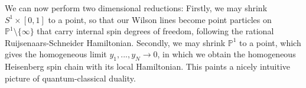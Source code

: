 \documentclass[11pt]{report}
\theoremstyle{definition}
\theoremstyle{remark}
\theoremstyle{remark}
\renewcommand{\P}{\mathbb{P}}
\begin{document}
We can now perform two dimensional reductions: Firstly, we may shrink $S^1 \times [0,1]$ to a point, so that our Wilson lines become point particles on $\P^1 \setminus \{ \infty \}$ that carry internal spin degrees of freedom, following the rational Ruijsenaars-Schneider Hamiltonian. Secondly, we may shrink $\P^1$ to a point, which gives the homogeneous limit $y_1,...,y_N \to 0$, in which we obtain the homogeneous Heisenberg spin chain with its local Hamiltonian. This paints a nicely intuitive picture of quantum-classical duality.

\end{document}
